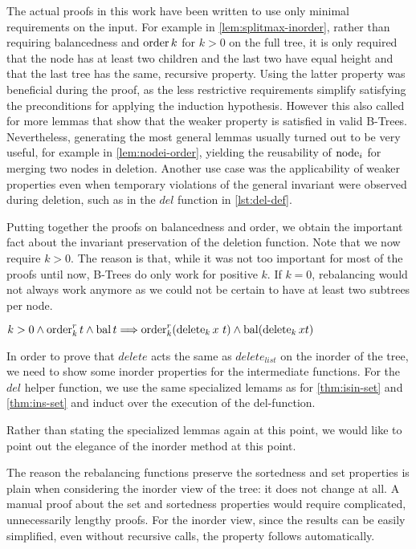 The actual proofs in this work have been written to use only
minimal requirements on the input.
For example in \autoref{lem:splitmax-inorder}, rather than
requiring balancedness and $\operatorname{order} k$ for $k > 0$ on the full tree,
it is only required that the node has at least two children
and the last two have equal height and that the last tree has the same, recursive property.
Using the latter property was beneficial during the proof,
as the less restrictive requirements simplify satisfying
the preconditions for applying the induction hypothesis.
However this also called for more lemmas that show that
the weaker property is satisfied in valid B-Trees.
Nevertheless, generating the most general lemmas usually turned out to be
very useful, for example in \autoref{lem:nodei-order}, yielding the reusability of $\operatorname{node}_i$ for
merging two nodes in deletion.
Another use case was the applicability of weaker properties
even when temporary violations
of the general invariant were observed during deletion,
such as in the $del$ function in \autoref{lst:del-def}.

Putting together the proofs on balancedness and
order, we obtain the important fact about the invariant preservation of the deletion function.
Note that we now require $k > 0$.
The reason is that, while it was not too important for most of the proofs until now,
B-Trees do only work for positive $k$.
If $k = 0$, rebalancing would not always work anymore
as we could not be certain to have at least two subtrees per node.

\begin{theorem}
    $k > 0 \wedge \operatorname{order}^r_k t \wedge \operatorname{bal} t \Longrightarrow
    \operatorname{order}^r_k (\operatorname{delete}_k x\ t) \wedge \operatorname{bal} (\operatorname{delete}_k x t)$
\end{theorem}

In order to prove that $delete$ acts the same as
$delete_{list}$ on the inorder of the tree,
we need to show some inorder properties for the intermediate functions.
For the $del$ helper function, 
we use the same specialized lemams
as for \autoref{thm:isin-set} and \autoref{thm:ins-set}
and induct over the execution of the del-function.

Rather than stating the specialized lemmas again at this point, we would like to point
out the elegance of the inorder method at this point.

The reason the rebalancing functions preserve the sortedness and set properties
is plain when considering the inorder view of the tree:
it does not change at all.
A manual proof about the set and sortedness properties
would require complicated, unnecessarily lengthy proofs.
For the inorder view, 
since the results can be easily simplified, even without recursive calls,
the property follows automatically.

